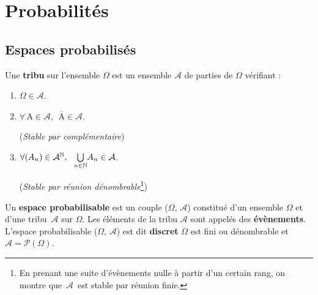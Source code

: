 
\section{Probabilités}

\vspace{0.7cm}
\subsection{Espaces probabilisés}

\vspace{1cm}

Une \textbf{tribu} sur l'ensemble \(\Omega\) est un ensemble \(\mathcal{A}\) de parties de \(\Omega\) vérifiant : \vspace{-0.1cm}
\begin{enumerate}[leftmargin=2cm]
    \item \(\Omega \in \mathcal{A}\).
    
    \item \(\forall\, \text{A}\in \mathcal{A},\ \ \overline{\text{A}}\in \mathcal{A}\).\hspace{3cm}
    \begin{small}
        (\emph{Stable par complémentaire})
    \end{small}

    \item \(\forall (A_n)\in \mathcal{A}^\NN,\ \ \underset{n\in \NN}{\bigcup}A_n \in \mathcal{A}\). \hspace{1.3cm} 
    \begin{small}
        (\emph{Stable par réunion dénombrable}\footnote{En prenant une suite d'évènements nulle à partir d'un certain rang, on montre que \(\,\mathcal{A}\,\) est stable par réunion finie.})
    \end{small}
\end{enumerate}

\vspace{1.3cm}

Un \textbf{espace probabilisable} est un couple (\(\Omega,\,\mathcal{A}\)) constitué d'un ensemble \(\Omega\) et d'une tribu \(\,\mathcal{A}\) sur \(\Omega\). Les éléments de la tribu \(\mathcal{A}\) sont appelés des \textbf{évènements}. L'espace probabilisable (\(\Omega,\,\mathcal{A}\)) est dit \textbf{discret} \ssi \(\Omega\) est fini ou dénombrable et \(\mathcal{A}=\mathcal{P}(\Omega)\).

\newpage

